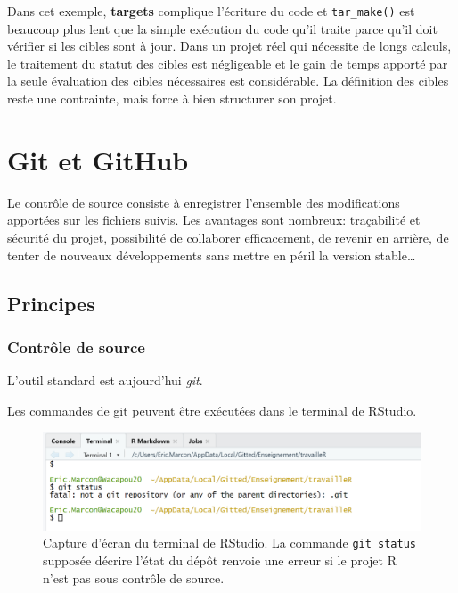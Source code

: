 \documentclass[
  12pt,
  french,
  a4paper,
  extrafontsizes,onecolumn,openright
  ]{memoir}
\begin{document}
Dans cet exemple, \textbf{targets} complique l'écriture du code et \texttt{tar\_make()} est beaucoup plus lent que la simple exécution du code qu'il traite parce qu'il doit vérifier si les cibles sont à jour.
Dans un projet réel qui nécessite de longs calculs, le traitement du statut des cibles est négligeable et le gain de temps apporté par la seule évaluation des cibles nécessaires est considérable.
La définition des cibles reste une contrainte, mais force à bien structurer son projet.

\hypertarget{chap:git}{%
\chapter{Git et GitHub}\label{chap:git}}

Le contrôle de source consiste à enregistrer l'ensemble des modifications apportées sur les fichiers suivis.
Les avantages sont nombreux: traçabilité et sécurité du projet, possibilité de collaborer efficacement, de revenir en arrière, de tenter de nouveaux développements sans mettre en péril la version stable\ldots{}

\hypertarget{sec:principes-git}{%
\section{Principes}\label{sec:principes-git}}

\hypertarget{sec:git-cds}{%
\subsection{Contrôle de source}\label{sec:git-cds}}

L'outil standard est aujourd'hui \emph{git}.

Les commandes de git peuvent être exécutées dans le terminal de RStudio.



\scriptsize

\begin{figure}

{\centering \includegraphics[width=0.8\linewidth]{images/git-Status} 

}

\caption{Capture d'écran du terminal de RStudio. La commande \texttt{git\ status} supposée décrire l'état du dépôt renvoie une erreur si le projet R n'est pas sous contrôle de source.}\label{fig:git-Status}
\end{figure}
\end{document}
